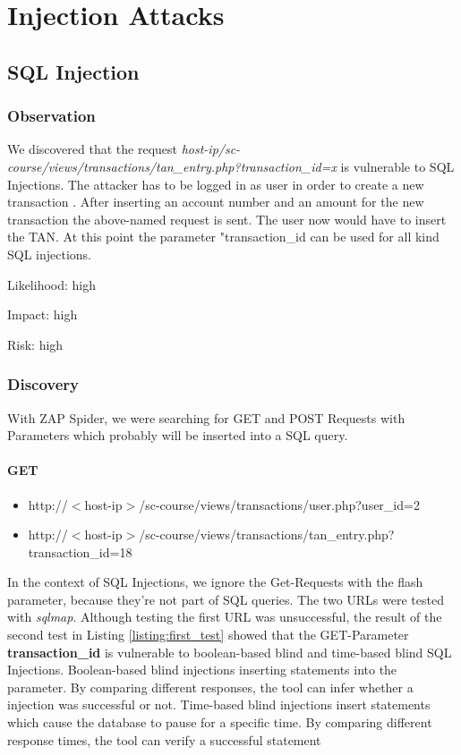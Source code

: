 
\chapter{Injection Attacks}

\section{SQL Injection}

\subsection{Observation}

We discovered that the request \textit{host-ip/sc-course/views/transactions/tan\_entry.php?transaction\_id=x} is vulnerable to SQL Injections.
The attacker has to be logged in as user in order to create a new transaction . After inserting an account number and an amount for the new transaction the above-named request is sent. The user now would have to insert the TAN. At this point the parameter "transaction\_id can be used for all kind SQL injections.


Likelihood: high\newline

Impact:      	high\newline

Risk: high \newline

\subsection{Discovery}
With ZAP Spider, we were searching for GET and POST Requests with Parameters which probably will be inserted into a SQL query.

\subsubsection{GET}
\begin{itemize}
	\item http://$<$host-ip$>$/sc-course/views/transactions/user.php?user\_id=2 
	\item http://$<$host-ip$>$/sc-course/views/transactions/tan\_entry.php?transaction\_id=18
	
\end{itemize}
 In the context of SQL Injections, we ignore the Get-Requests with the flash parameter, because they're not part of SQL queries.
 The two URLs were tested with \textit{sqlmap}. Although testing the first URL was unsuccessful, the result of the second test in Listing \ref{listing:first_test} showed that the GET-Parameter\textbf{ transaction\_id} is vulnerable to boolean-based blind and time-based blind SQL Injections. Boolean-based blind injections inserting statements into the parameter. By comparing different responses, the tool can infer whether a injection was successful or not.
 Time-based blind injections insert statements which cause the database to pause for a specific time. By comparing different response times, the tool can verify a successful statement
 



